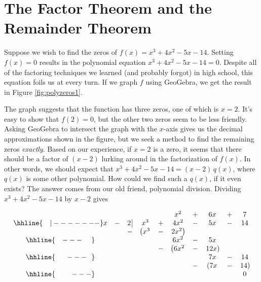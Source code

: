 \section{The Factor Theorem and the Remainder Theorem}
\label{Polydivision}


Suppose we wish to find the zeros of $f(x) = x^3 + 4x^2-5x-14$.  Setting $f(x)=0$ results in the polynomial equation $x^3 + 4x^2-5x-14=0$.   Despite all of the factoring techniques we learned (and probably forgot) in high school, this equation foils us at every turn.  If we graph $f$ using GeoGebra, we get the result in Figure \ref{fig:polyzeros1}.


The graph suggests that the function has three zeros, one of which is $x=2$.  It's easy to show that $f(2) = 0$, but the other two zeros seem to be less friendly. Asking GeoGebra to intersect the graph with the $x$-axis gives us the decimal approximations shown in the figure, but we seek a method to find the remaining zeros \emph{exactly}.  Based on our experience, if $x=2$ is a zero, it seems that there should be a factor of $(x-2)$ lurking around in the factorization of $f(x)$.  In other words, we should expect that $x^3 + 4x^2-5x-14=(x-2) \, q(x)$, where $q(x)$ is some other polynomial.  How could we find such a $q(x)$, if it even exists?  The answer comes from our old friend, polynomial division. Dividing $x^3 + 4x^2-5x-14$ by $x-2$ gives


\setlength\arraycolsep{0.1pt}
\setlength\extrarowheight{2pt}

\[ \begin{array}{cccccccccc}

& & & & & x^2 & + & 6x & + & 7 \\ \hhline{~~~|-------}

x & - & 2 \, \vline& x^3 & + & 4x^2 & - & 5x & - & 14 \\

 &  &  -& \left(x^3 \right. & - & \left.  2x^2\right) &  &  &  &  \\ \hhline{~~~---~~~~} 
 &  &  &   &  & 6 x^2 & - & 5x &  &  \\ 
 &  &  &   & - & \left(6 x^2 \right. & - & \left. 12x \right) &  &  \\ \hhline{~~~~~---~~} 
 &  &  &   &   &  & & 7x  & - & 14 \\
 &  &  &   &   &  & - & \left( 7x \right. & - & \left. 14 \right) \\ \hhline{~~~~~~~---} 
 &   &  &  &  &  &  &  &  & 0
 
\end{array}\]

